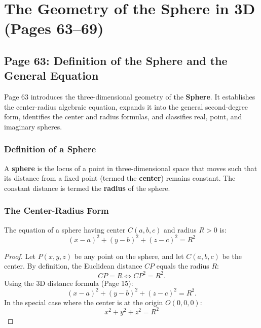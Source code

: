 \chapter{The Geometry of the Sphere in 3D (Pages 63--69)}
\label{ch:the_sphere}

\section{Page 63: Definition of the Sphere and the General Equation}
\label{sec:page63}

\begin{conceptbox}
Page 63 introduces the three-dimensional geometry of the \textbf{Sphere}. It establishes the center-radius algebraic equation, expands it into the general second-degree form, identifies the center and radius formulas, and classifies real, point, and imaginary spheres.
\end{conceptbox}

\subsection{Definition of a Sphere}
\begin{conceptbox}
A \textbf{sphere} is the locus of a point in three-dimensional space that moves such that its distance from a fixed point (termed the \textbf{center}) remains constant. The constant distance is termed the \textbf{radius} of the sphere.
\end{conceptbox}

\subsection{The Center-Radius Form}
\begin{theorembox}
The equation of a sphere having center $C(a, b, c)$ and radius $R > 0$ is:
\begin{equation}
    \boxed{(x - a)^2 + (y - b)^2 + (z - c)^2 = R^2}
\end{equation}
\end{theorembox}

\begin{proof}
Let $P(x, y, z)$ be any point on the sphere, and let $C(a, b, c)$ be the center.
By definition, the Euclidean distance $CP$ equals the radius $R$:
\begin{equation}
    CP = R \iff CP^2 = R^2.
\end{equation}
Using the 3D distance formula (Page 15):
\begin{equation}
    (x - a)^2 + (y - b)^2 + (z - c)^2 = R^2.
\end{equation}
In the special case where the center is at the origin $O(0, 0, 0)$:
\begin{equation}
    \boxed{x^2 + y^2 + z^2 = R^2}
\end{equation}
\end{proof}


